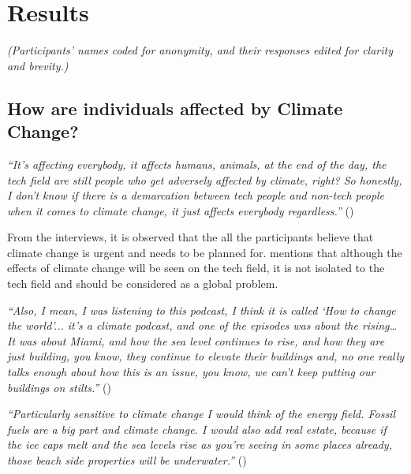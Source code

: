 \section{Results}

\emph{(Participants' names coded for anonymity, and their responses edited for clarity and brevity.)}

    \subsection{How are individuals affected by Climate Change?}
    
    \begin{quoting}
        \textit{``It's affecting everybody, it affects humans, animals, at the end of the day, the tech field are still people who get adversely affected by climate, right? So honestly, I don't know if there is a demarcation between tech people and non-tech people when it comes to climate change, it just affects everybody regardless.''} ()
    \end{quoting}

    From the interviews, it is observed that the all the participants believe that climate change is urgent and needs to be planned for.  mentions that although the effects of climate change will be seen on the tech field, it is not isolated to the tech field and should be considered as a global problem.
    
    \begin{quoting}
        \textit{``Also, I mean, I was listening to this podcast, I think it is called `How to change the world'... it's a climate podcast, and one of the episodes was about the rising… It was about Miami, and how the sea level continues to rise, and how they are just building, you know, they continue to elevate their buildings and, no one really talks enough about how this is an issue, you know, we can't keep putting our buildings on stilts.''} ()
    \end{quoting}
    
    \begin{quoting}
        \textit{``Particularly sensitive to climate change I would think of the energy field. Fossil fuels are a big part and climate change. I would also add real estate, because if the ice caps melt and the sea levels rise as you're seeing in some places already, those beach side properties will be underwater.''} ()
    \end{quoting}

